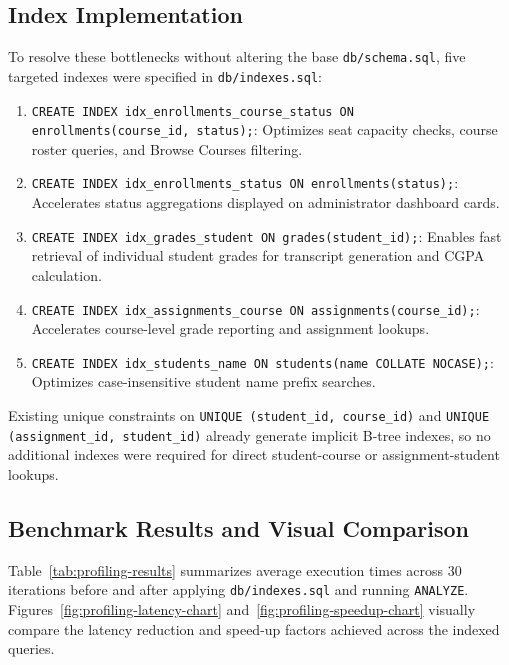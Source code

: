 \subsection{Index Implementation}
To resolve these bottlenecks without altering the base \texttt{db/schema.sql}, five targeted indexes were specified in \texttt{db/indexes.sql}:
\begin{enumerate}
    \item \texttt{CREATE INDEX idx\_enrollments\_course\_status ON enrollments(course\_id, status);}: Optimizes seat capacity checks, course roster queries, and Browse Courses filtering.
    \item \texttt{CREATE INDEX idx\_enrollments\_status ON enrollments(status);}: Accelerates status aggregations displayed on administrator dashboard cards.
    \item \texttt{CREATE INDEX idx\_grades\_student ON grades(student\_id);}: Enables fast retrieval of individual student grades for transcript generation and CGPA calculation.
    \item \texttt{CREATE INDEX idx\_assignments\_course ON assignments(course\_id);}: Accelerates course-level grade reporting and assignment lookups.
    \item \texttt{CREATE INDEX idx\_students\_name ON students(name COLLATE NOCASE);}: Optimizes case-insensitive student name prefix searches.
\end{enumerate}

Existing unique constraints on \texttt{UNIQUE (student\_id, course\_id)} and \texttt{UNIQUE (assignment\_id, student\_id)} already generate implicit B-tree indexes, so no additional indexes were required for direct student-course or assignment-student lookups.

\subsection{Benchmark Results and Visual Comparison}
Table~\ref{tab:profiling-results} summarizes average execution times across 30 iterations before and after applying \texttt{db/indexes.sql} and running \texttt{ANALYZE}. Figures~\ref{fig:profiling-latency-chart} and~\ref{fig:profiling-speedup-chart} visually compare the latency reduction and speed-up factors achieved across the indexed queries.

